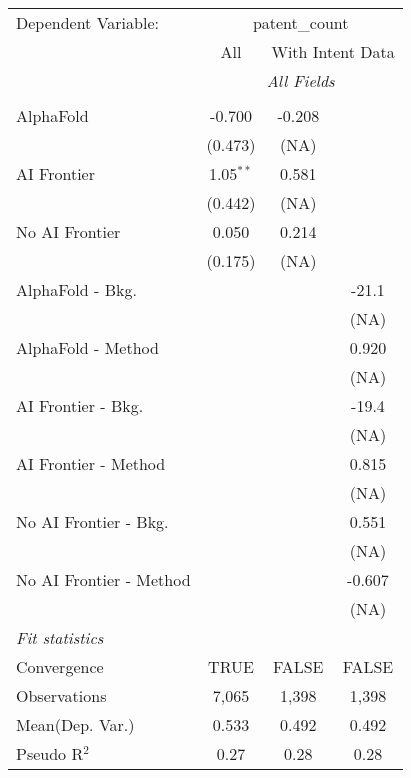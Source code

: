 \begingroup
\centering
\begin{tabular}{lccc}
   \tabularnewline \midrule \midrule
   Dependent Variable: & \multicolumn{3}{c}{patent\_count}\\
 & \multicolumn{1}{c}{All} & \multicolumn{2}{c}{With Intent Data} \\
\cmidrule(lr){2-2} \cmidrule(lr){3-4}
 & \multicolumn{3}{c}{\textit{All Fields}} \\ \\
   AlphaFold               & -0.700      & -0.208 &   \\   
                           & (0.473)     & (NA)   &   \\   
   AI Frontier             & 1.05$^{**}$ & 0.581  &   \\   
                           & (0.442)     & (NA)   &   \\   
   No AI Frontier          & 0.050       & 0.214  &   \\   
                           & (0.175)     & (NA)   &   \\   
   AlphaFold - Bkg.        &             &        & -21.1\\   
                           &             &        & (NA)\\   
   AlphaFold - Method      &             &        & 0.920\\   
                           &             &        & (NA)\\   
   AI Frontier - Bkg.      &             &        & -19.4\\   
                           &             &        & (NA)\\   
   AI Frontier - Method    &             &        & 0.815\\   
                           &             &        & (NA)\\   
   No AI Frontier - Bkg.   &             &        & 0.551\\   
                           &             &        & (NA)\\   
   No AI Frontier - Method &             &        & -0.607\\   
                           &             &        & (NA)\\   
   \midrule
   \emph{Fit statistics}\\
   Convergence             &TRUE         & FALSE  & FALSE\\  
   Observations            & 7,065       & 1,398  & 1,398\\  
Mean(Dep. Var.) & 0.533 & 0.492 & 0.492 \\
   Pseudo R$^2$            & 0.27        & 0.28   & 0.28\\  
   

\end{tabular}
